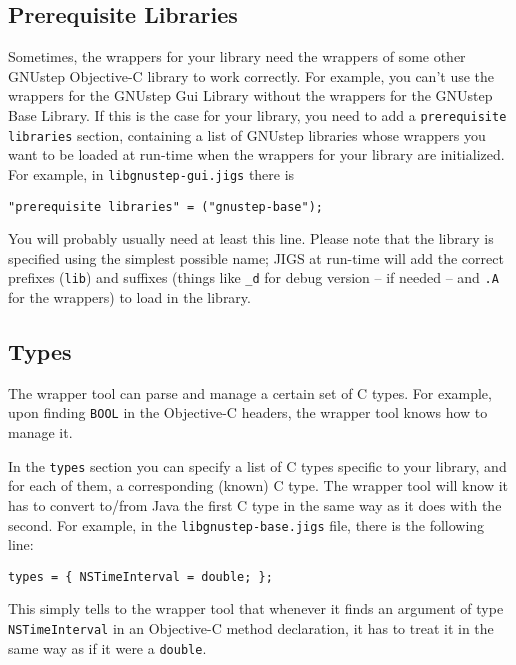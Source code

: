 \subsection{Prerequisite Libraries}
Sometimes, the wrappers for your library need the wrappers of some
other GNUstep Objective-C library to work correctly.  For example, you
can't use the wrappers for the GNUstep Gui Library without the
wrappers for the GNUstep Base Library.  If this is the case for your
library, you need to add a \texttt{prerequisite libraries} section,
containing a list of GNUstep libraries whose wrappers you want to be
loaded at run-time when the wrappers for your library are initialized.
For example, in \texttt{libgnustep-gui.jigs} there is
\begin{verbatim}
"prerequisite libraries" = ("gnustep-base");
\end{verbatim}
You will probably usually need at least this line.  Please note that
the library is specified using the simplest possible name; JIGS at
run-time will add the correct prefixes (\texttt{lib}) and suffixes
(things like \texttt{\_d} for debug version -- if needed -- and
\texttt{.A} for the wrappers) to load in the library.

\subsection{Types}
The wrapper tool can parse and manage a certain set of C types.  For
example, upon finding \texttt{BOOL} in the Objective-C headers, the
wrapper tool knows how to manage it.

In the \texttt{types} section you can specify a list of C types
specific to your library, and for each of them, a corresponding
(known) C type.  The wrapper tool will know it has to convert to/from
Java the first C type in the same way as it does with the second.  For
example, in the \texttt{libgnustep-base.jigs} file, there is the
following line:
\begin{verbatim}
types = { NSTimeInterval = double; };
\end{verbatim}
This simply tells to the wrapper tool that whenever it finds an argument 
of type \texttt{NSTimeInterval} in an Objective-C method declaration, it 
has to treat it in the same way as if it were a \texttt{double}.


